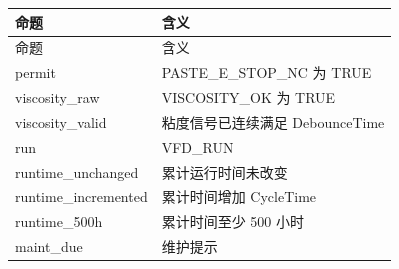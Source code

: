 \begin{longtable}{L{3.3cm}L{10.0cm}}

\toprule

命题 & 含义\\

\midrule

\endfirsthead

\toprule

命题 & 含义\\

\midrule

\endhead

{\ttfamily permit} & PASTE\_E\_STOP\_NC 为 TRUE\\

{\ttfamily viscosity\_raw} & VISCOSITY\_OK 为 TRUE\\

{\ttfamily viscosity\_valid} & 粘度信号已连续满足 DebounceTime\\

{\ttfamily run} & VFD\_RUN\\

{\ttfamily runtime\_unchanged} & 累计运行时间未改变\\

{\ttfamily runtime\_incremented} & 累计时间增加 CycleTime\\

{\ttfamily runtime\_500h} & 累计时间至少 500 小时\\

{\ttfamily maint\_due} & 维护提示\\

\bottomrule

\end{longtable}

